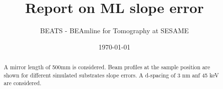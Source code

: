 \documentclass{sesamebeatsnote}
\title{Report on ML slope error}
\author{BEATS - BEAmline for Tomography at SESAME}
\date{\today}
\begin{document}
\maketitle

\begin{abstract}
A mirror length of 500mm is considered. Beam profiles at the sample position are shown for different simulated substrates slope errors. A d-spacing of 3 nm anf 45 keV are considered. 
\end{abstract}

\vfill
\makereviewtable
\clearpage

\begingroup
\color{black}
\tableofcontents
\listoffigures
\listoftables
\endgroup
\pagebreak










\end{document}
